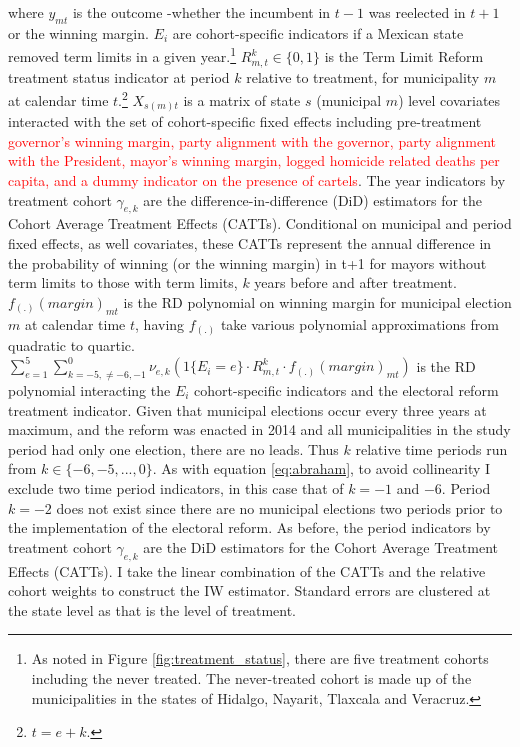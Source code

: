 \documentclass[12pt]{amsart}
\numberwithin{equation}{section}
\theoremstyle{definition}
\theoremstyle{definition}
\theoremstyle{definition}
\begin{document}
where $y_{mt}$ is the outcome -whether the incumbent in $t-1$ was reelected in $t+1$ or the winning margin. $E_i$ are cohort-specific indicators if a Mexican state removed term limits in a given year.\footnote{As noted in Figure \ref{fig:treatment_status}, there are five treatment cohorts including the never treated. The never-treated cohort is made up of the municipalities in the states of Hidalgo, Nayarit, Tlaxcala and Veracruz.} $R^k_{m,t}\in \{0,1\}$  is the Term Limit Reform treatment status indicator at period $k$ relative to treatment, for municipality $m$ at calendar time $t$.\footnote{$t=e+k$.} $X_{s(m)t}$ is a matrix of state $s$ (municipal $m$) level covariates interacted with the set of cohort-specific fixed effects including pre-treatment \textcolor{red}{governor's winning margin, party alignment with the governor, party alignment with the President, mayor's winning margin, logged homicide related deaths per capita, and a dummy indicator on the presence of cartels}.  The year indicators by treatment cohort  $\gamma_{e,k}$ are the difference-in-difference (DiD) estimators for the Cohort Average Treatment Effects (CATTs). Conditional on municipal and period fixed effects, as well covariates, these CATTs represent the annual difference in the probability of winning (or the winning margin) in t+1 for mayors without term limits to those with term limits, $k$ years before and after treatment. $f_{(.)}(margin)_{mt}$ is the RD polynomial on winning margin for municipal election $m$ at calendar time $t$, having $f_{(.)}$ take various polynomial approximations from quadratic to quartic. $\sum^5_{e=1} \sum^{0}_{k=-5, \neq {-6,-1}} \nu_{e,k}(1\{E_i=e\} \cdot R^k_{m,t} \cdot  f_{(.)}(margin)_{mt} ) $ is the RD polynomial interacting the $E_i$ cohort-specific indicators and the electoral reform treatment indicator. Given that municipal elections occur every three years at maximum, and the reform was enacted in 2014 and all municipalities in the study period had only one election, there are no leads. Thus $k$ relative time periods run from  $k \in\{-6,-5,...,0\}$. As with equation \ref{eq:abraham}, to avoid collinearity I exclude two time period indicators, in this case that of $k=-1$ and $-6$.  Period $k=-2$ does not exist since there are no municipal elections two periods prior to the implementation of the electoral reform. As before, the period indicators by treatment cohort  $\gamma_{e,k}$ are the DiD estimators for the Cohort Average Treatment Effects (CATTs). I take the linear combination of the CATTs and the relative cohort weights to construct the IW estimator. Standard errors are clustered at the state level as that is the level of treatment. %
\end{document}
